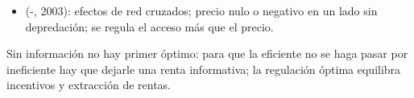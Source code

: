 \documentclass{article}
\begin{document}
\begin{columnas}
\begin{itemize}
\begin{itemize}
  \end{itemize}
\end{itemize}
\begin{itemize}
\item {} (-, 2003): efectos de red cruzados; precio nulo o negativo en un lado sin depredación; se regula el acceso más que el precio.
\end{itemize}

\begin{ideaclave}
Sin información no hay primer óptimo: para que la eficiente no se haga pasar por ineficiente hay que dejarle una renta informativa; la regulación óptima equilibra incentivos y extracción de rentas.
\end{ideaclave}


\end{columnas}
\end{document}
